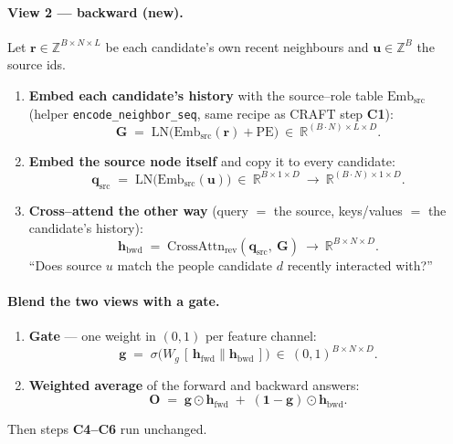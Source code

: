 \documentclass[11pt]{article}
\newcommand{\R}{\mathbb{R}}
\newcommand{\code}[1]{\texttt{\small #1}}
\newcommand{\elt}{\odot}                 %
\newcommand{\concat}{\mathbin{\|}}       %
\newcommand{\Emb}{\mathrm{Emb}}
\newcommand{\LN}{\mathrm{LN}}
\newcommand{\CA}{\mathrm{CrossAttn}}
\newcommand{\pos}{\mathrm{PE}}
\begin{document}
\paragraph{View 2 --- backward (new).}
Let $\bm{r}\in\mathbb{Z}^{B\times N\times L}$ be each candidate's own recent
neighbours and $\bm{u}\in\mathbb{Z}^{B}$ the source ids.

\begin{enumerate}[label=\textbf{V5.\arabic*},leftmargin=3.6em]
  \item \textbf{Embed each candidate's history} with the source--role table
        $\Emb_{\mathrm{src}}$ (helper \code{encode\_neighbor\_seq}, same recipe as
        CRAFT step \textbf{C1}):
        \[
          \bm{G} \;=\; \LN\big(\Emb_{\mathrm{src}}(\bm{r}) + \pos\big)
          \ \in\ \R^{(B\cdot N)\times L\times D}.
        \]

  \item \textbf{Embed the source node itself} and copy it to every candidate:
        \[
          \bm{q}_{\text{src}} \;=\; \LN\big(\Emb_{\mathrm{src}}(\bm{u})\big)\ \in\ \R^{B\times 1\times D}
          \ \longrightarrow\ \R^{(B\cdot N)\times 1\times D}.
        \]

  \item \textbf{Cross--attend the other way} (query $=$ the source,
        keys/values $=$ the candidate's history):
        \[
          \bm{h}_{\text{bwd}} \;=\; \CA_{\text{rev}}(\bm{q}_{\text{src}},\ \bm{G})
          \ \longrightarrow\ \R^{B\times N\times D}.
        \]
        ``Does source $u$ match the people candidate $d$ recently interacted with?''
\end{enumerate}

\paragraph{Blend the two views with a gate.}
\begin{enumerate}[label=\textbf{V5.\arabic*},leftmargin=3.6em,start=4]
  \item \textbf{Gate} --- one weight in $(0,1)$ per feature channel:
        \[
          \bm{g} \;=\; \sigma\!\big(W_g\,[\,\bm{h}_{\text{fwd}}\concat\bm{h}_{\text{bwd}}\,]\big)\ \in\ (0,1)^{B\times N\times D}.
        \]

  \item \textbf{Weighted average} of the forward and backward answers:
        \[
          \bm{O} \;=\; \bm{g}\elt\bm{h}_{\text{fwd}} \;+\; (\bm{1}-\bm{g})\elt\bm{h}_{\text{bwd}}.
        \]
\end{enumerate}
Then steps \textbf{C4--C6} run unchanged.
\end{document}
